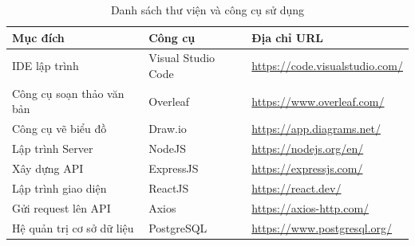 \documentclass[../DoAn.tex]{subfiles}
\begin{document}
\begin{table}[H]
\centering{}
    \begin{tabular}{lll}
        \hline
        \textbf{Mục đích} & \textbf{Công cụ} & \textbf{Địa chỉ URL} \\ \hline
        IDE lập trình & Visual Studio Code & \url{https://code.visualstudio.com/} \\ \hline
        Công cụ soạn thảo văn bản & Overleaf & \url{https://www.overleaf.com/} \\ \hline
        Công cụ vẽ biểu đồ & Draw.io & \url{https://app.diagrams.net/} \\ \hline
        Lập trình Server & NodeJS & \url{https://nodejs.org/en/} \\ \hline
        Xây dựng API & ExpressJS & \url{https://expressjs.com/} \\ \hline
        Lập trình giao diện & ReactJS & \url{https://react.dev/} \\ \hline
        Gửi request lên API & Axios & \url{https://axios-http.com/} \\ \hline
        Hệ quản trị cơ sở dữ liệu & PostgreSQL & \url{https://www.postgresql.org/} \\ \hline
        \end{tabular}
    \caption{Danh sách thư viện và công cụ sử dụng}
    \label{fig:my_label}
\end{table}
\end{document}
